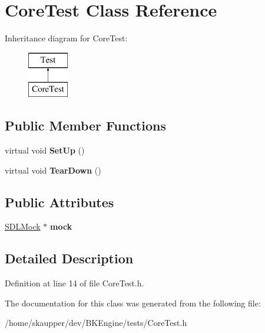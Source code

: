 \hypertarget{classCoreTest}{}\section{Core\+Test Class Reference}
\label{classCoreTest}
Inheritance diagram for Core\+Test\+:\begin{figure}[H]
\begin{center}
\leavevmode
\includegraphics[height=2.000000cm]{classCoreTest}
\end{center}
\end{figure}
\subsection*{Public Member Functions}
\begin{DoxyCompactItemize}
\item 
\mbox{\label{classCoreTest_a22a5fdd342d0595ba2569bb389c6828f}} 
virtual void {\bfseries Set\+Up} ()
\item 
\mbox{\label{classCoreTest_acc29a8f5c4eb93a6ff01637f81ec4fd9}} 
virtual void {\bfseries Tear\+Down} ()
\end{DoxyCompactItemize}
\subsection*{Public Attributes}
\begin{DoxyCompactItemize}
\item 
\mbox{\label{classCoreTest_a3c5a4de48beffb922c5af71827d33427}} 
\hyperlink{classSDLMock}{S\+D\+L\+Mock} $\ast$ {\bfseries mock}
\end{DoxyCompactItemize}


\subsection{Detailed Description}


Definition at line 14 of file Core\+Test.\+h.



The documentation for this class was generated from the following file\+:\begin{DoxyCompactItemize}
\item 
/home/skaupper/dev/\+B\+K\+Engine/tests/Core\+Test.\+h\end{DoxyCompactItemize}
